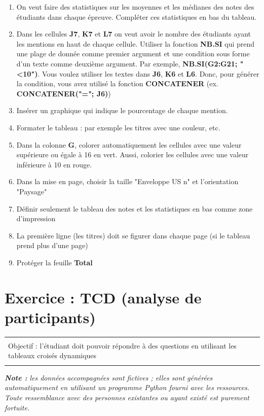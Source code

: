 \documentclass[11pt, a4paper]{article}
\begin{document}
\begin{enumerate}
	\item On veut faire des statistiques sur les moyennes et les médianes des notes des étudiants dans chaque épreuve. Compléter ces statistiques en bas du tableau. 
	\item Dans les cellules \textbf{J7}, \textbf{K7} et \textbf{L7} on veut avoir le nombre des étudiants ayant les mentions en haut de chaque cellule. Utiliser la fonction \textbf{NB.SI} qui prend une plage de donnée comme premier argument et une condition sous forme d'un texte comme deuxième argument. Par exemple, \textbf{NB.SI(G2:G21; "<10")}. Vous voulez utiliser les textes dans \textbf{J6}, \textbf{K6} et \textbf{L6}. Donc, pour générer la condition, vous avez utilisé la fonction \textbf{CONCATENER} (ex. \textbf{CONCATENER("="; J6)})
	\item Insérer un graphique qui indique le pourcentage de chaque mention. 
	\item Formater le tableau : par exemple les titres avec une couleur, etc. 
	\item Dans la colonne \textbf{G}, colorer automatiquement les cellules avec une valeur supérieure ou égale à 16 en vert. Aussi, colorier les cellules avec une valeur inférieure à 10 en rouge.
	\item Dans la mise en page, choisir la taille "Enveloppe US n" et l'orientation "Paysage"
	\item Définir seulement le tableau des notes et les statistiques en bas comme zone d'impression 
	\item La première ligne (les titres) doit se figurer dans chaque page (si le tableau prend plus d'une page)
	\item Protéger la feuille \textbf{Total}
\end{enumerate}


\section*{Exercice : TCD (analyse de participants)}

\vspace{-12pt}
\begin{tabular}{|p{\textwidth}|}
	\hline\\
	Objectif : l'étudiant doit pouvoir répondre à des questions en utilisant les tableaux croisés dynamiques  \\\\
	\hline
\end{tabular}

\textit{\textbf{Note : } les données accompagnées sont fictives ; elles sont générées automatiquement en utilisant un programme Python fourni avec les ressources. Toute ressemblance avec des personnes existantes ou ayant existé est purement fortuite.}
\end{document}
